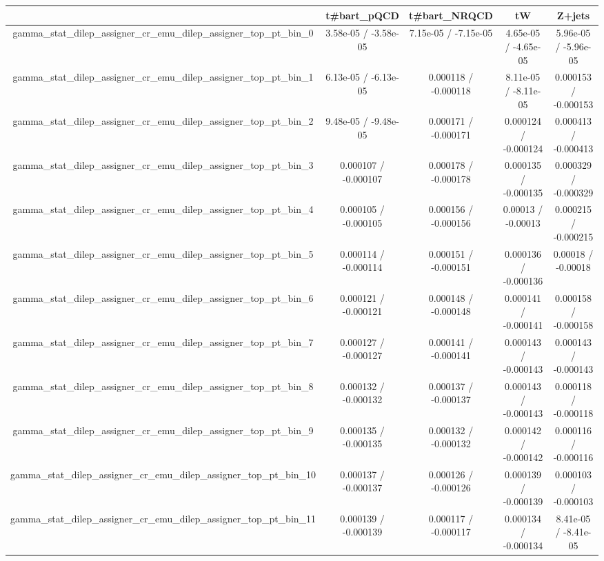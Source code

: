 \documentclass[10pt]{article}
\begin{document}
\begin{table}[htbp]
\begin{center}
\begin{tabular}{|c|c|c|c|c|}
\hline 
      & t#bar{t}_{pQCD}      & t#bar{t}_{NRQCD}      & tW      & Z+jets \\ 
\hline 
  gamma_stat_dilep_assigner_cr_emu_dilep_assigner_top_pt_bin_0 & 3.58e-05 / -3.58e-05 & 7.15e-05 / -7.15e-05 & 4.65e-05 / -4.65e-05 & 5.96e-05 / -5.96e-05 \\ 
  gamma_stat_dilep_assigner_cr_emu_dilep_assigner_top_pt_bin_1 & 6.13e-05 / -6.13e-05 & 0.000118 / -0.000118 & 8.11e-05 / -8.11e-05 & 0.000153 / -0.000153 \\ 
  gamma_stat_dilep_assigner_cr_emu_dilep_assigner_top_pt_bin_2 & 9.48e-05 / -9.48e-05 & 0.000171 / -0.000171 & 0.000124 / -0.000124 & 0.000413 / -0.000413 \\ 
  gamma_stat_dilep_assigner_cr_emu_dilep_assigner_top_pt_bin_3 & 0.000107 / -0.000107 & 0.000178 / -0.000178 & 0.000135 / -0.000135 & 0.000329 / -0.000329 \\ 
  gamma_stat_dilep_assigner_cr_emu_dilep_assigner_top_pt_bin_4 & 0.000105 / -0.000105 & 0.000156 / -0.000156 & 0.00013 / -0.00013 & 0.000215 / -0.000215 \\ 
  gamma_stat_dilep_assigner_cr_emu_dilep_assigner_top_pt_bin_5 & 0.000114 / -0.000114 & 0.000151 / -0.000151 & 0.000136 / -0.000136 & 0.00018 / -0.00018 \\ 
  gamma_stat_dilep_assigner_cr_emu_dilep_assigner_top_pt_bin_6 & 0.000121 / -0.000121 & 0.000148 / -0.000148 & 0.000141 / -0.000141 & 0.000158 / -0.000158 \\ 
  gamma_stat_dilep_assigner_cr_emu_dilep_assigner_top_pt_bin_7 & 0.000127 / -0.000127 & 0.000141 / -0.000141 & 0.000143 / -0.000143 & 0.000143 / -0.000143 \\ 
  gamma_stat_dilep_assigner_cr_emu_dilep_assigner_top_pt_bin_8 & 0.000132 / -0.000132 & 0.000137 / -0.000137 & 0.000143 / -0.000143 & 0.000118 / -0.000118 \\ 
  gamma_stat_dilep_assigner_cr_emu_dilep_assigner_top_pt_bin_9 & 0.000135 / -0.000135 & 0.000132 / -0.000132 & 0.000142 / -0.000142 & 0.000116 / -0.000116 \\ 
  gamma_stat_dilep_assigner_cr_emu_dilep_assigner_top_pt_bin_10 & 0.000137 / -0.000137 & 0.000126 / -0.000126 & 0.000139 / -0.000139 & 0.000103 / -0.000103 \\ 
  gamma_stat_dilep_assigner_cr_emu_dilep_assigner_top_pt_bin_11 & 0.000139 / -0.000139 & 0.000117 / -0.000117 & 0.000134 / -0.000134 & 8.41e-05 / -8.41e-05 \\ 

\end{tabular}
\end{center}
\end{table}
\end{document}

